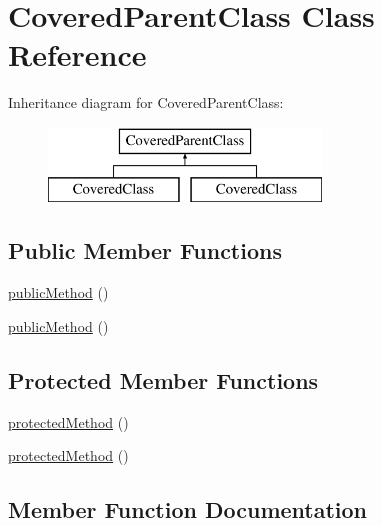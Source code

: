 \hypertarget{class_covered_parent_class}{}\section{Covered\+Parent\+Class Class Reference}
\label{class_covered_parent_class}
Inheritance diagram for Covered\+Parent\+Class\+:\begin{figure}[H]
\begin{center}
\leavevmode
\includegraphics[height=2.000000cm]{class_covered_parent_class}
\end{center}
\end{figure}
\subsection*{Public Member Functions}
\begin{DoxyCompactItemize}
\item 
\mbox{\hyperlink{class_covered_parent_class_ab07dfd901b43d1dcdbc2d116d7f5a566}{public\+Method}} ()
\item 
\mbox{\hyperlink{class_covered_parent_class_ab07dfd901b43d1dcdbc2d116d7f5a566}{public\+Method}} ()
\end{DoxyCompactItemize}
\subsection*{Protected Member Functions}
\begin{DoxyCompactItemize}
\item 
\mbox{\hyperlink{class_covered_parent_class_ab718380de0530a34b65401f7e81a211f}{protected\+Method}} ()
\item 
\mbox{\hyperlink{class_covered_parent_class_ab718380de0530a34b65401f7e81a211f}{protected\+Method}} ()
\end{DoxyCompactItemize}


\subsection{Member Function Documentation}
\mbox{\label{class_covered_parent_class_ab718380de0530a34b65401f7e81a211f}} 
